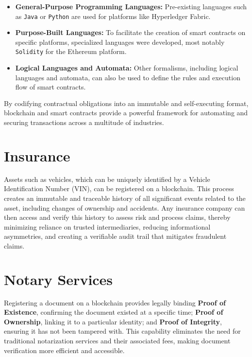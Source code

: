 \documentclass{scrbook}
\begin{document}
\begin{itemize}
    \item \textbf{General-Purpose Programming Languages:} Pre-existing languages such as \texttt{Java} or \texttt{Python} are used for platforms like Hyperledger Fabric.
    
    \item \textbf{Purpose-Built Languages:} To facilitate the creation of smart contracts on specific platforms, specialized languages were developed, most notably \texttt{Solidity} for the Ethereum platform.
    
    \item \textbf{Logical Languages and Automata:} Other formalisms, including logical languages and automata, can also be used to define the rules and execution flow of smart contracts.
\end{itemize}

By codifying contractual obligations into an immutable and self-executing format, blockchain and smart contracts provide a powerful framework for automating and securing transactions across a multitude of industries.

\section{Insurance}

Assets such as vehicles, which can be uniquely identified by a Vehicle Identification Number (VIN), can be registered on a blockchain. This process creates an immutable and traceable history of all significant events related to the asset, including changes of ownership and accidents. Any insurance company can then access and verify this history to assess risk and process claims, thereby minimizing reliance on trusted intermediaries, reducing informational asymmetries, and creating a verifiable audit trail that mitigates fraudulent claims.

\section{Notary Services}

Registering a document on a blockchain provides legally binding \textbf{Proof of Existence}, confirming the document existed at a specific time; \textbf{Proof of Ownership}, linking it to a particular identity; and \textbf{Proof of Integrity}, ensuring it has not been tampered with. This capability eliminates the need for traditional notarization services and their associated fees, making document verification more efficient and accessible.
    
\end{document}
